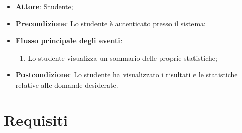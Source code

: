 \documentclass[12pt,a4paper]{article}
\begin{document}
\begin{itemize}

\item \textbf{Attore}: Studente; 
\item \textbf{Precondizione}: Lo studente è autenticato presso il sistema;

\item \textbf{Flusso principale degli eventi}:
\begin{enumerate}
	\item Lo studente visualizza un sommario delle proprie statistiche;
	
\end{enumerate}
\item \textbf{Postcondizione}: Lo studente ha visualizzato i risultati e le statistiche relative alle domande desiderate.
\end{itemize}

\newpage
\section{Requisiti}
\end{document}
